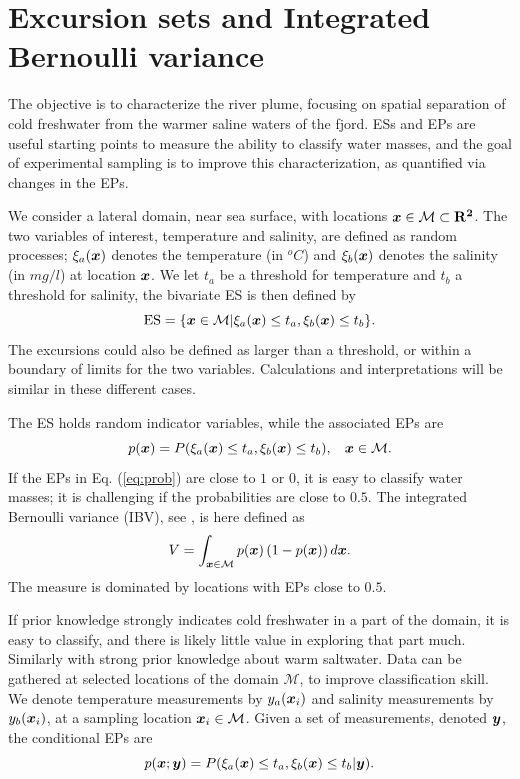 \documentclass[aoas]{imsart}
\begin{document}


\section{Excursion sets and Integrated Bernoulli variance}
\label{sec:ESEP}

The objective is to characterize the river plume, focusing on spatial separation of cold freshwater from the warmer saline waters of the fjord. ESs and EPs are useful starting points to measure the ability to classify water masses, and the goal of experimental sampling is to improve this characterization, as quantified via changes in the EPs.

We consider a lateral domain, near sea surface, with locations ${\boldsymbol x} \in \mathcal{M} \subset \mathbf{R^2}$. The two variables of interest, temperature and salinity, are defined as random processes; $\xi_a({\boldsymbol x})$ denotes the temperature (in $^o C$) and $\xi_b({\boldsymbol x})$ denotes the salinity (in $mg/l$) at location ${\boldsymbol x}$.
We let $t_a$ be
a threshold for temperature and $t_b$ a threshold for salinity, the bivariate ES is then defined by
 \begin{equation}\label{ES}
     \mbox{ES} = \{\bx \in \mathcal{M} | \xi_a(\bx) \leq t_a,\xi_b(\bx) \leq t_b\}.
 \end{equation}
 The excursions could also be defined as larger than a threshold, or
 within a boundary of limits for the two variables. Calculations and
 interpretations will be similar in these different cases.

The ES holds random indicator variables, while the associated EPs are 
\begin{equation}\label{eq:prob}
 p(\bx) = P(\xi_a(\bx) \leq t_a, \xi_b(\bx) \leq t_b), \hspace{3mm} \bx \in \mathcal{M}.
\end{equation}
If the EPs in Eq. (\ref{eq:prob}) are
close to $1$ or $0$, it is easy to classify water masses; it is
challenging if the probabilities are close to $0.5$. 
The integrated Bernoulli variance (IBV), see \cite{bect2019}, is here defined as 
\begin{equation}\label{measVAR}
    V = \int_{\bx \in \mathcal{M}} p(\bx) \left(1-p(\bx)\right) d\bx.
\end{equation}
The measure is dominated by locations with EPs close to $0.5$.

If prior knowledge strongly indicates cold freshwater in a part of the domain, it is easy to classify, and there is likely little value in exploring that part much. Similarly with strong prior knowledge about warm saltwater. 
Data can be gathered at selected locations of the domain $\mathcal{M}$, to improve classification skill. We denote temperature measurements by $y_{a}({\boldsymbol x}_i)$ and salinity measurements by $y_{b}({\boldsymbol x}_i)$, at a sampling location ${\boldsymbol x}_i \in \mathcal{M}$. Given a set of measurements, denoted ${\boldsymbol y}$, the conditional EPs are
\begin{equation}\label{eq:post_ep}
 p(\bx;\by) = P(\xi_a(\bx) \leq t_a, \xi_b(\bx) \leq t_b |\by). 
\end{equation}
\end{document}
